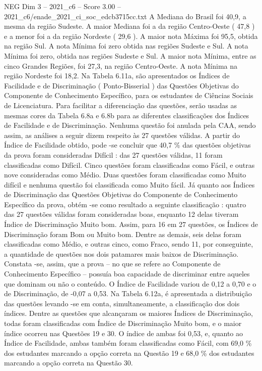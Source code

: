 \begin{textsample}{NEG Dim 3 – 2021\_c6 – Score 3.00 – 2021\_c6/enade\_2021\_ci\_soc\_edcb3715cc.txt}
A Mediana do Brasil foi 40,9, a mesma da região Sudeste.
A maior Mediana foi a da região Centro-Oeste ( 47,8 ) e a menor foi a da região Nordeste ( 29,6 ).
A maior nota Máxima foi 95,5, obtida na região Sul.
A nota Mínima foi zero obtida nas regiões Sudeste e Sul.
A nota Mínima foi zero, obtida nas regiões Sudeste e Sul.
A maior nota Mínima, entre as cinco Grandes Regiões, foi 27,3, na região Centro-Oeste.
A nota Mínima na região Nordeste foi 18,2.
Na Tabela 6.11a, são apresentados os Índices de Facilidade e de Discriminação ( Ponto-Bisserial ) das Questões Objetivas do Componente de Conhecimento Específico, para os estudantes de Ciências Sociais de Licenciatura.
Para facilitar a diferenciação das questões, serão usadas as mesmas cores da Tabela 6.8a e 6.8b para as diferentes classificações dos Índices de Facilidade e de Discriminação.
Nenhuma questão foi anulada pela CAA, sendo assim, as análises a seguir dizem respeito às 27 questões válidas.
A partir do Índice de Facilidade obtido, pode -se concluir que 40,7 \% das questões objetivas da prova foram consideradas Difícil : das 27 questões válidas, 11 foram classificadas como Difícil.
Cinco questões foram classificadas como Fácil, e outras nove consideradas como Médio.
Duas questões foram classificadas como Muito difícil e nenhuma questão foi classificada como Muito fácil.
Já quanto aos Índices de Discriminação das Questões Objetivas do Componente de Conhecimento Específico da prova, obtém -se como resultado a seguinte classificação : quatro das 27 questões válidas foram consideradas boas, enquanto 12 delas tiveram Índice de Discriminação Muito bom.
Assim, para 16 em 27 questões, os Índices de Discriminação foram Bom ou Muito bom.
Dentre as demais, seis delas foram classificadas como Médio, e outras cinco, como Fraco, sendo 11, por conseguinte, a quantidade de questões nos dois patamares mais baixos de Discriminação.
Constata -se, assim, que a prova – no que se refere ao Componente de Conhecimento Específico – possuía boa capacidade de discriminar entre aqueles que dominam ou não o conteúdo.
O Índice de Facilidade variou de 0,12 a 0,70 e o de Discriminação, de -0,07 a 0,53.
Na Tabela 6.12a, é apresentada a distribuição das questões levando -se em conta, simultaneamente, a classificação dos dois índices.
Dentre as questões que alcançaram os maiores Índices de Discriminação, todas foram classificadas com Índice de Discriminação Muito bom, e o maior índice ocorreu nas Questões 19 e 30.
O índice de ambas foi 0,53, e, quanto ao Índice de Facilidade, ambas também foram classificadas como Fácil, com 69,0 \% dos estudantes marcando a opção correta na Questão 19 e 68,0 \% dos estudantes marcando a opção correta na Questão 30.

\end{textsample}
